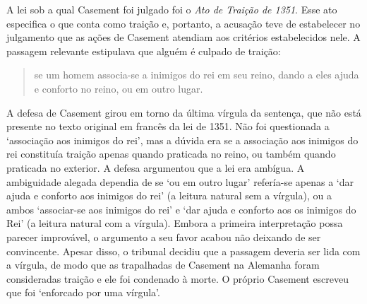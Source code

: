 A lei sob a qual Casement foi julgado foi o \emph{Ato de Traição de 1351}. Esse ato especifica o que conta como traição e, portanto, a acusação teve de estabelecer no julgamento que as ações de Casement atendiam aos critérios estabelecidos nele. A passagem relevante estipulava que alguém é culpado de traição:
\begin{quote}
	se um homem associa-se a inimigos do rei em seu
reino, dando a eles ajuda e conforto no reino, ou em outro lugar.
\end{quote} 

A defesa de Casement girou em torno da última vírgula da sentença, que não está presente no texto original em francês da lei de 1351. Não foi questionada a `associação aos inimigos do rei', mas a dúvida era se a associação aos inimigos do rei constituía traição apenas quando praticada no reino, ou também quando praticada no exterior. A defesa argumentou que a lei era ambígua. A ambiguidade alegada dependia de se `ou em outro lugar' refería-se apenas a `dar ajuda e conforto aos inimigos do rei' (a leitura natural sem a vírgula), ou a ambos `associar-se aos inimigos do rei' e `dar ajuda e conforto aos os inimigos do Rei' (a leitura natural com a vírgula). Embora a primeira interpretação possa parecer improvável, o argumento a seu favor acabou não deixando de ser convincente. Apesar disso, o tribunal decidiu que a passagem deveria ser lida com a vírgula, de modo que as trapalhadas de Casement na Alemanha foram consideradas traição e ele foi condenado à morte. O próprio Casement escreveu que foi `enforcado por uma vírgula'.

